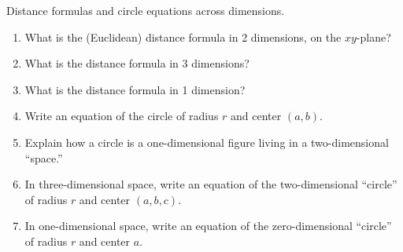\begin{prob}
Distance formulas and circle equations across dimensions.  
\begin{enumerate}
\item What is the (Euclidean) distance formula in 2 dimensions, on the $xy$-plane?  
\item What is the distance formula in 3 dimensions?
\item What is the distance formula in 1 dimension?
\item Write an equation of the circle of radius $r$ and center $(a, b)$.  
\item Explain how a circle is a one-dimensional figure living in a two-dimensional ``space.''
\item In three-dimensional space, write an equation of the two-dimensional ``circle'' of radius $r$ and center $(a, b, c)$.  
\item In one-dimensional space, write an equation of the zero-dimensional ``circle'' of radius $r$ and center $a$.  
\end{enumerate}
\end{prob}

%

